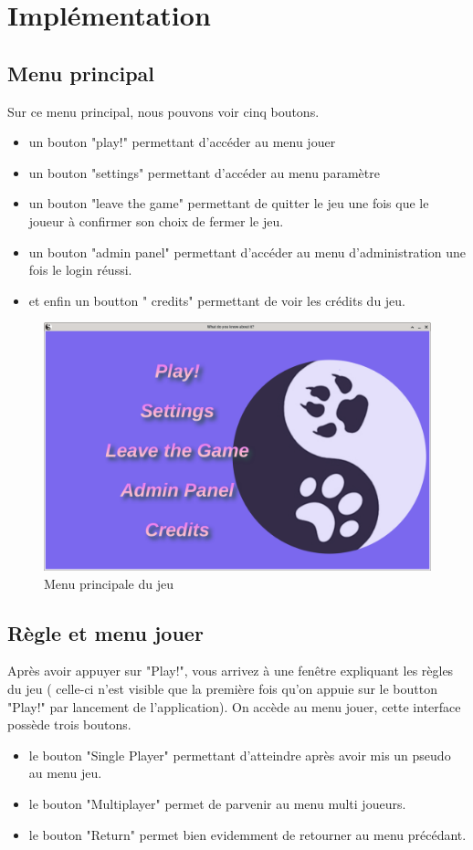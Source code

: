 \newpage
\section{Implémentation}
\subsection{Menu principal}
Sur ce menu principal, nous pouvons voir cinq boutons. 
\begin{itemize}
	\item un bouton "play!" permettant d'accéder au menu jouer
	\item un bouton "settings" permettant d'accéder au menu paramètre
	\item un bouton "leave the game" permettant de quitter le jeu une fois que le joueur à confirmer son choix de 
		fermer le jeu.
	\item un bouton "admin panel" permettant d'accéder au menu d'administration une fois le login réussi.
	\item et enfin un boutton " credits" permettant de voir les crédits du jeu.
\end{itemize}

\begin{figure}[h]
	\centering
	\includegraphics[width=\textwidth]{jeu_main_menu.png}
	\caption{Menu principale du jeu}
	\label{fig:jeu_main_menu}
\end{figure}

\newpage
\subsection{Règle et menu jouer}
Après avoir appuyer sur "Play!", vous arrivez à une fenêtre expliquant les règles du jeu ( celle-ci n'est 
visible que la première fois qu'on appuie sur le boutton "Play!" par lancement de l'application). On accède 
au menu jouer, cette interface possède trois boutons. 
\begin{itemize}
	\item le bouton "Single Player" permettant d'atteindre après avoir mis un pseudo au menu jeu.
	\item le bouton "Multiplayer" permet de parvenir au menu multi joueurs.
	\item le bouton "Return" permet bien evidemment de retourner au menu précédant.
\end{itemize}

